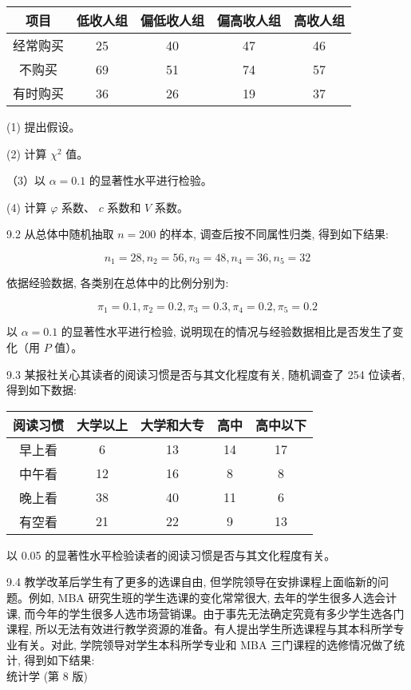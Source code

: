 \documentclass[10pt]{article}
\begin{document}
\begin{CJK*}{UTF8}{bsmi}
\begin{center}
\begin{tabular}{ccccc}
\hline
项目 & 低收人组 & 偏低收人组 & 偏高收人组 & 高收人组 \\
\hline
经常购买 & 25 & 40 & 47 & 46 \\
不购买 & 69 & 51 & 74 & 57 \\
有时购买 & 36 & 26 & 19 & 37 \\
\hline
\end{tabular}
\end{center}

(1) 提出假设。

(2) 计算 $\chi^{2}$ 值。

（3）以 $\alpha=0.1$ 的显著性水平进行检验。

(4) 计算 $\varphi$ 系数、 $c$ 系数和 $V$ 系数。

9.2 从总体中随机抽取 $n=200$ 的样本, 调查后按不同属性归类, 得到如下结果:

$$
n_{1}=28, n_{2}=56, n_{3}=48, n_{4}=36, n_{5}=32
$$

依据经验数据, 各类别在总体中的比例分别为:

$$
\pi_{1}=0.1, \pi_{2}=0.2, \pi_{3}=0.3, \pi_{4}=0.2, \pi_{5}=0.2
$$

以 $\alpha=0.1$ 的显著性水平进行检验, 说明现在的情况与经验数据相比是否发生了变化（用 $P$ 值）。

9.3 某报社关心其读者的阅读习惯是否与其文化程度有关, 随机调查了 254 位读者, 得到如下数据:

\begin{center}
\begin{tabular}{ccccc}
\hline
阅读习惯 & 大学以上 & 大学和大专 & 高中 & 高中以下 \\
\hline
早上看 & 6 & 13 & 14 & 17 \\
中午看 & 12 & 16 & 8 & 8 \\
晚上看 & 38 & 40 & 11 & 6 \\
有空看 & 21 & 22 & 9 & 13 \\
\hline
\end{tabular}
\end{center}

以 0.05 的显著性水平检验读者的阅读习惯是否与其文化程度有关。

9.4 教学改革后学生有了更多的选课自由, 但学院领导在安排课程上面临新的问题。例如, MBA 研究生班的学生选课的变化常常很大, 去年的学生很多人选会计课, 而今年的学生很多人选市场营销课。由于事先无法确定究竟有多少学生选各门课程, 所以无法有效进行教学资源的准备。有人提出学生所选课程与其本科所学专业有关。对此, 学院领导对学生本科所学专业和 MBA 三门课程的选修情况做了统计, 得到如下结果:\\
统计学 (第 8 版)


\end{CJK*}
\end{document}
